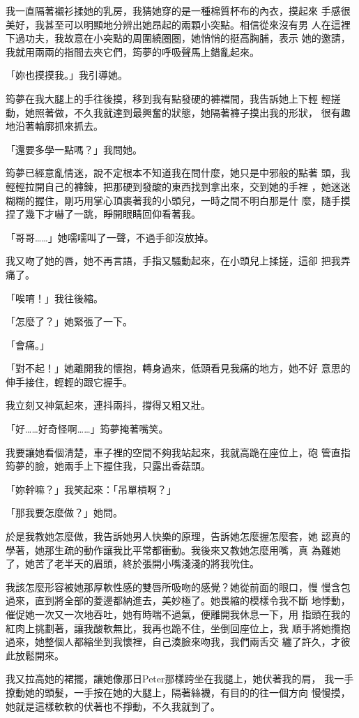 我一直隔著襯衫揉她的乳房，我猜她穿的是一種棉質杯布的內衣，摸起來
手感很美好，我甚至可以明顯地分辨出她昂起的兩顆小突點。相信從來沒有男
人在這裡下過功夫，我故意在小突點的周圍繞圈圈，她悄悄的挺高胸脯，表示
她的邀請，我就用兩兩的指間去夾它們，筠夢的呼吸聲馬上錯亂起來。

「妳也摸摸我。」我引導她。

筠夢在我大腿上的手往後摸，移到我有點發硬的褲襠間，我告訴她上下輕
輕搓動，她照著做，不久我就達到最興奮的狀態，她隔著褲子摸出我的形狀，
很有趣地沿著輪廓抓來抓去。

「還要多學一點嗎？」我問她。

筠夢已經意亂情迷，說不定根本不知道我在問什麼，她只是中邪般的點著
頭，我輕輕拉開自己的褲鍊，把那硬到發酸的東西找到拿出來，交到她的手裡
，她迷迷糊糊的握住，剛巧用掌心頂裹著我的小頭兒，一時之間不明白那是什
麼，隨手摸捏了幾下才嚇了一跳，睜開眼睛回仰看著我。

「哥哥……」她嚅嚅叫了一聲，不過手卻沒放掉。

我又吻了她的唇，她不再言語，手指又騷動起來，在小頭兒上揉搓，這卻
把我弄痛了。

「唉唷！」我往後縮。

「怎麼了？」她緊張了一下。

「會痛。」

「對不起！」她離開我的懷抱，轉身過來，低頭看見我痛的地方，她不好
意思的伸手接住，輕輕的跟它握手。

我立刻又神氣起來，連抖兩抖，撐得又粗又壯。

「好……好奇怪啊……」筠夢掩著嘴笑。

我要讓她看個清楚，車子裡的空間不夠我站起來，我就高跪在座位上，砲
管直指筠夢的臉，她兩手上下握住我，只露出香菇頭。

「妳幹嘛？」我笑起來：「吊單槓啊？」

「那我要怎麼做？」她問。

於是我教她怎麼做，我告訴她男人快樂的原理，告訴她怎麼握怎麼套，她
認真的學著，她那生疏的動作讓我比平常都衝動。我後來又教她怎麼用嘴，真
為難她了，她苦了老半天的眉頭，終於張開小嘴淺淺的將我吮住。

我該怎麼形容被她那厚軟性感的雙唇所吸吻的感覺？她從前面的眼口，慢
慢含包過來，直到將全部的菱邊都納進去，美妙極了。她畏縮的模樣令我不斷
地悸動，催促她一次又一次地吞吐，她有時喘不過氣，便離開我休息一下，用
指頭在我的紅肉上挑劃著，讓我酸軟無比，我再也跪不住，坐倒回座位上，我
順手將她攬抱過來，她整個人都縮坐到我懷裡，自己湊臉來吻我，我們兩舌交
纏了許久，才彼此放鬆開來。

我又拉高她的裙擺，讓她像那日Peter那樣跨坐在我腿上，她伏著我的肩，
我一手撩動她的頭髮，一手按在她的大腿上，隔著絲襪，有目的的往一個方向
慢慢摸，她就是這樣軟軟的伏著也不掙動，不久我就到了。

